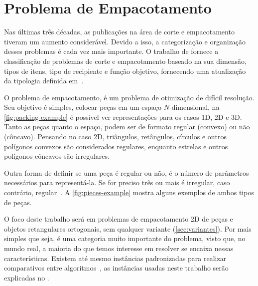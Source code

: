 \chapter{Problema de Empacotamento}\label{ch:problema-de-empacotamento}

Nas últimas três décadas, as publicações na área de corte e empacotamento tiveram um aumento
considerável.
Devido a isso, a categorização e organização desses problemas é cada vez mais importante.
O trabalho de \citeauthor*{wascher2007improved} fornece a classificação de problemas de corte e
empacotamento baseado na sua dimensão, tipos de itens, tipo de recipiente e função objetivo,
fornecendo uma atualização da tipologia definida em~\cite{dyckhoff1990typology}.

O problema de empacotamento, é um problema de otimização de difícil resolução.
Seu objetivo é simples, colocar peças em um espaço $N$-dimensional, na \autoref{fig:packing-example}
é possível ver representações para os casos 1D, 2D e 3D\@.
Tanto as peças quanto o espaço, podem ser de formato regular (convexo) ou não (côncavo).
Pensando no caso 2D, triângulos, retângulos, círculos e outros polígonos convexos são
considerados regulares, enquanto estrelas e outros polígonos côncavos são irregulares.

Outra forma de definir se uma peça é regular ou não, é o número de parâmetros necessários
para representá-la.
Se for preciso três ou mais é irregular, caso contrário, regular~\cite{aprendizado-reforco}.
A \autoref{fig:pieces-example} mostra alguns exemplos de ambos tipos de peças.



O foco deste trabalho será em problemas de empacotamento 2D de peças e objetos retangulares
ortogonais, sem qualquer variante (\autoref{sec:variantes}).
Por mais simples que seja, é uma categoria muito importante do problema, visto que, no mundo real,
a maioria do que temos interesse em resolver se encaixa nessas características.
Existem até mesmo instâncias padronizadas para realizar comparativos entre algoritmos~\cite{2DPackLib},
as instâncias usadas neste trabalho serão explicadas no .



